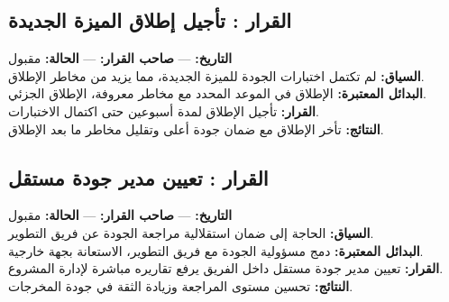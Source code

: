 \documentclass[11pt,a4paper]{article}
\begin{document}
\subsection{القرار : تأجيل إطلاق الميزة الجديدة}
\noindent\textbf{التاريخ:} --- \quad \textbf{صاحب القرار:} --- \quad \textbf{الحالة:} مقبول \\[0.5em]
\textbf{السياق:} لم تكتمل اختبارات الجودة للميزة الجديدة، مما يزيد من مخاطر الإطلاق. \\[0.3em]
\textbf{البدائل المعتبرة:} الإطلاق في الموعد المحدد مع مخاطر معروفة، الإطلاق الجزئي. \\[0.3em]
\textbf{القرار:} تأجيل الإطلاق لمدة أسبوعين حتى اكتمال الاختبارات. \\[0.3em]
\textbf{النتائج:} تأخر الإطلاق مع ضمان جودة أعلى وتقليل مخاطر ما بعد الإطلاق.

\subsection{القرار : تعيين مدير جودة مستقل}
\noindent\textbf{التاريخ:} --- \quad \textbf{صاحب القرار:} --- \quad \textbf{الحالة:} مقبول \\[0.5em]
\textbf{السياق:} الحاجة إلى ضمان استقلالية مراجعة الجودة عن فريق التطوير. \\[0.3em]
\textbf{البدائل المعتبرة:} دمج مسؤولية الجودة مع فريق التطوير، الاستعانة بجهة خارجية. \\[0.3em]
\textbf{القرار:} تعيين مدير جودة مستقل داخل الفريق يرفع تقاريره مباشرة لإدارة المشروع. \\[0.3em]
\textbf{النتائج:} تحسين مستوى المراجعة وزيادة الثقة في جودة المخرجات.
\end{document}
